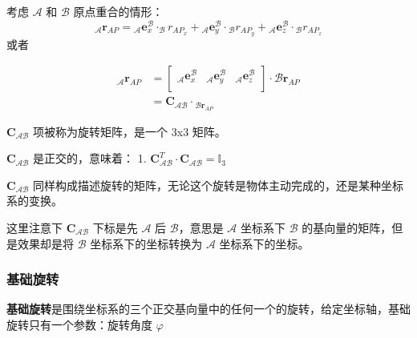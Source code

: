 \documentclass[11pt]{ctexart}
\begin{document}
考虑 $\mathcal{A}$ 和 $\mathcal{B}$ 原点重合的情形：
\begin{equation}
_{\mathcal{A}}\mathbf{r}_{AP}={}_{\mathcal{A}}\mathbf{e}_{x}^{\mathcal{B}}\cdot_{\mathcal{B}}r_{AP_{x}}+{}_{\mathcal{A}}\mathbf{e}_{y}^{\mathcal{B}}\cdot{}_{\mathcal{B}}r_{AP_{y}}+{}_{\mathcal{A}}\mathbf{e}_{z}^{\mathcal{B}}\cdot{}_{\mathcal{B}}r_{AP_{z}}
\end{equation}
或者

\begin{equation}
\begin{aligned}
    _{\mathcal{A}}\mathbf{r}_{AP}& \left.=\left[\begin{array}{ccc}{{_{\mathcal{A}}\mathbf{e}_{x}^{\mathcal{B}}}}&{{_{\mathcal{A}}\mathbf{e}_{y}^{\mathcal{B}}}}&{{_{\mathcal{A}}\mathbf{e}_{z}^{\mathcal{B}}}}\\\end{array}\right.\right]\cdot\mathcal{B}\mathbf{r}_{AP}  \\
    &=\mathbf{C}_{\mathcal{AB}}\cdot{}_{\mathcal{B}\mathbf{r}_{AP}}
    \end{aligned}
\end{equation}

$\mathbf{C}_{\mathcal{A}\mathcal{B}}$ 项被称为旋转矩阵，是一个 3x3 矩阵。

$\mathbf{C}_{\mathcal{A}\mathcal{B}}$ 是正交的，意味着：
1. $\mathbf{C}_{\mathcal{AB}}^T\cdot\mathbf{C}_{\mathcal{AB}}=\mathbb{I}_3$

$\mathbf{C}_{\mathcal{A}\mathcal{B}}$ 同样构成描述旋转的矩阵，无论这个旋转是物体主动完成的，还是某种坐标系的变换。


这里注意下 $\mathbf{C}_{\mathcal{A}\mathcal{B}}$ 下标是先 $\mathcal{A}$ 后 $\mathcal{B}$，意思是 $\mathcal{A}$ 坐标系下 $\mathcal{B}$ 的基向量的矩阵，但是效果却是将 $\mathcal{B}$ 坐标系下的坐标转换为 $\mathcal{A}$ 坐标系下的坐标。

\subsubsection{基础旋转}
\textbf{基础旋转}是围绕坐标系的三个正交基向量中的任何一个的旋转，给定坐标轴，基础旋转只有一个参数：旋转角度 $\varphi$
\end{document}

